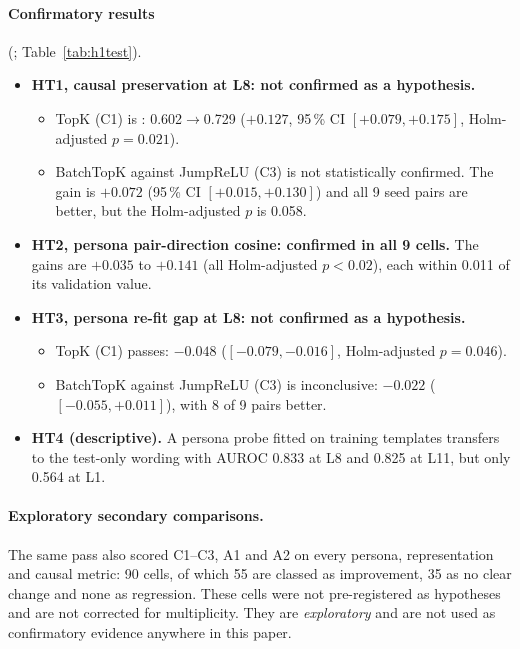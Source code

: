 \paragraph{Confirmatory results} (; Table~\ref{tab:h1test}).
\begin{itemize}
\item \textbf{HT1, causal preservation at L8: not confirmed as a hypothesis.}
  \begin{itemize}
  \item TopK (C1) is : 0.602$\to$0.729 ($+0.127$, 95\,\% CI $[+0.079, +0.175]$, Holm-adjusted
    $p=0.021$).
  \item BatchTopK against JumpReLU (C3) is not statistically confirmed. The gain is $+0.072$ (95\,\% CI
    $[+0.015, +0.130]$) and all 9 seed pairs are better, but the Holm-adjusted $p$ is 0.058.
  \end{itemize}
\item \textbf{HT2, persona pair-direction cosine: confirmed in all 9 cells.} The gains are $+0.035$ to $+0.141$
  (all Holm-adjusted $p<0.02$), each within 0.011 of its validation value.
\item \textbf{HT3, persona re-fit gap at L8: not confirmed as a hypothesis.}
  \begin{itemize}
  \item TopK (C1) passes: $-0.048$ ($[-0.079, -0.016]$, Holm-adjusted $p=0.046$).
  \item BatchTopK against JumpReLU (C3) is inconclusive: $-0.022$ ($[-0.055, +0.011]$), with 8 of 9 pairs better.
  \end{itemize}
\item \textbf{HT4 (descriptive).} A persona probe fitted on training templates transfers to the test-only wording
  with AUROC 0.833 at L8 and 0.825 at L11, but only 0.564 at L1.
\end{itemize}

\paragraph{Exploratory secondary comparisons.} The same pass also scored C1--C3, A1 and A2 on every
persona, representation and causal metric: 90 cells, of which 55 are classed as improvement, 35 as no clear change
and none as regression. These cells were not pre-registered as hypotheses and are not corrected for multiplicity. They
are \emph{exploratory} and are not used as confirmatory evidence anywhere in this paper.

